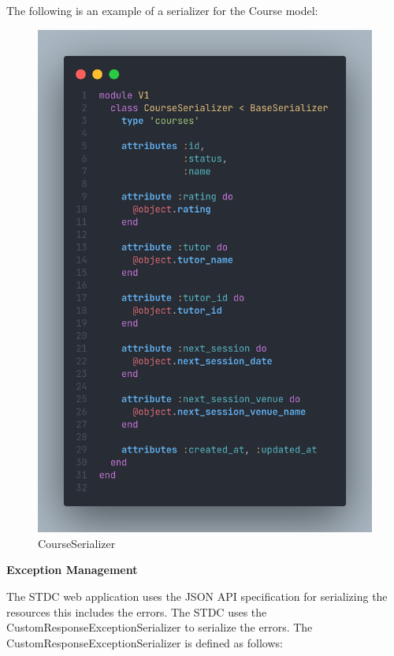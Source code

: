\begin{justify}
    \vspace{0.25cm}
    \newendline The following is an example of a serializer for the Course model:

    \begin{figure}[H]
        \centerline{\includegraphics[width=150mm,scale=1]{figures/implementation_and_testing/implementation/backend/courses_serializer.png}}
        \caption{CourseSerializer}
    \end{figure}

    \noindent \textbf{Exception Management}

    \vspace{0.25cm}
    \newendline The STDC web application uses the JSON API specification for serializing the resources this includes the errors. The STDC uses the CustomResponseExceptionSerializer to serialize the errors. The CustomResponseExceptionSerializer is defined as follows:


\end{justify}
